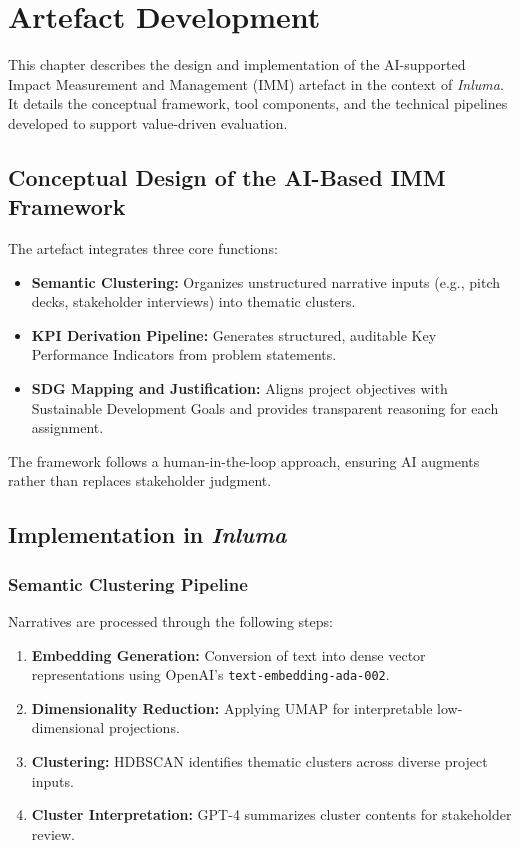 \chapter{Artefact Development}\label{ch:artefact-development}

This chapter describes the design and implementation of the AI-supported Impact Measurement and Management (IMM) artefact in the context of \textit{Inluma}.
It details the conceptual framework, tool components, and the technical pipelines developed to support value-driven evaluation.

\section{Conceptual Design of the AI-Based IMM Framework}\label{sec:conceptual-design}

The artefact integrates three core functions:

\begin{itemize}
    \item \textbf{Semantic Clustering:} Organizes unstructured narrative inputs (e.g., pitch decks, stakeholder interviews) into thematic clusters.
    \item \textbf{KPI Derivation Pipeline:} Generates structured, auditable Key Performance Indicators from problem statements.
    \item \textbf{SDG Mapping and Justification:} Aligns project objectives with Sustainable Development Goals and provides transparent reasoning for each assignment.
\end{itemize}

The framework follows a human-in-the-loop approach, ensuring AI augments rather than replaces stakeholder judgment.

\section{Implementation in \textit{Inluma}}\label{sec:implementation-in-inluma}

\subsection{Semantic Clustering Pipeline}\label{subsec:semantic-clustering}

Narratives are processed through the following steps:

\begin{enumerate}
    \item \textbf{Embedding Generation:} Conversion of text into dense vector representations using OpenAI’s \texttt{text-embedding-ada-002}.
    \item \textbf{Dimensionality Reduction:} Applying UMAP for interpretable low-dimensional projections.
    \item \textbf{Clustering:} HDBSCAN identifies thematic clusters across diverse project inputs.
    \item \textbf{Cluster Interpretation:} GPT-4 summarizes cluster contents for stakeholder review.
\end{enumerate}

